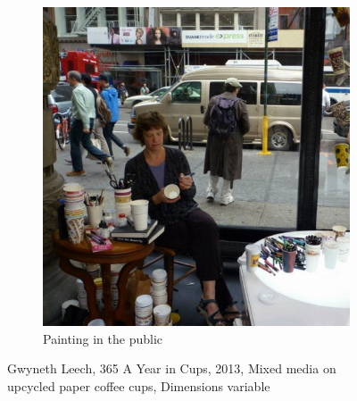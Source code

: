 \begin{figure}[h!]
\begin{subfigure}{.47\textwidth}
  \includegraphics[width=\linewidth]{graphics/Gwyneth-Leech-cup3.jpg}
  \caption{Painting in the public}
  \label{fig:GwynethLeech_Public}
\end{subfigure}
\caption{Gwyneth Leech, 365 A Year in Cups, 2013, Mixed media on upcycled paper coffee cups, Dimensions variable}
\label{fig:GwynethLeech_CoffeeCups}
\end{figure}

